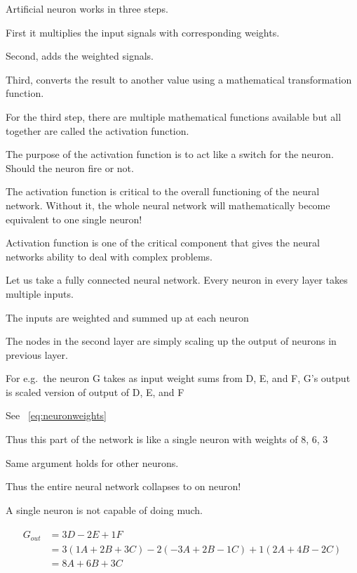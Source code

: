 	\begin{bulletedlist}
		\item Artificial neuron works in three steps.
		\begin{numberedlist}
			\item First it multiplies the input signals with corresponding weights.
			\item Second, adds the weighted signals.
			\item Third, converts the result to another value using a mathematical transformation function.
		\end{numberedlist}
		\item For the third step, there are multiple mathematical functions available but all together are called the activation function.
		\item The purpose of the activation function is to act like a switch for the neuron. Should the neuron fire or not.
		\item The activation function is critical to the overall functioning of the neural network. Without it, the whole neural network will mathematically become equivalent to one single neuron!
		\item Activation function is one of the critical component that gives the neural networks ability to deal with complex problems.
		\item Let us take a fully connected neural network. Every neuron in every layer takes multiple inputs.
		\item The inputs are weighted and summed up at each neuron
		\item The nodes in the second layer are simply scaling up the output of neurons in previous layer.
		\item For e.g.\ the neuron G takes as input weight sums from D, E, and F, G's output is scaled version of output of D, E, and F
		\item See \equationname~\ref{eq:neuronweights}
		\item Thus this part of the network is like a single neuron with weights of 8, 6, 3
		\item Same argument holds for other neurons.
		\item Thus the entire neural network collapses to on neuron!
		\item A single neuron is not capable of doing much.
	\end{bulletedlist}


	\begin{align}
		\begin{split}
		 G_{out}	& = 3D -2E + 1F	\\
				& = 3(1A + 2B + 3C) - 2(-3A + 2B -1C) + 1(2A+4B-2C)	\\
				& = 8A + 6B + 3C
		\end{split}
		\label{eq:neuronweights}
	\end{align}

